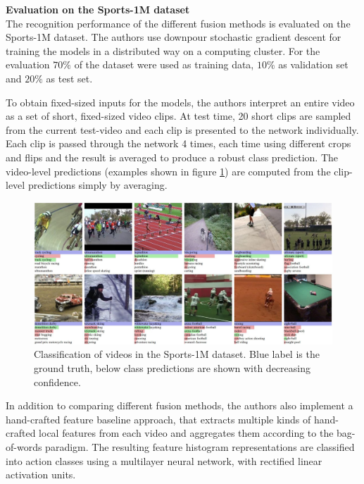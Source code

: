 \textbf{Evaluation on the Sports-1M dataset}\\
The recognition performance of the different fusion methods is evaluated on the Sports-1M dataset.
The authors use downpour stochastic gradient descent \cite{dean_large_2012} for training the models in a distributed way on a computing cluster.
For the evaluation $70\%$ of the dataset were used as training data, $10\%$ as validation set and $20\%$ as test set.

To obtain fixed-sized inputs for the models, the authors interpret an entire video as a set of short, fixed-sized video clips.
At test time, 20 short clips are sampled from the current test-video and each clip is presented to the network individually.
Each clip is passed through the network 4 times, each time using different crops and flips and the result is averaged to produce a robust class prediction.
The video-level predictions (examples shown in figure \ref{fig:largescale_classification}) are computed from the clip-level predictions simply by averaging.

\begin{figure}[H]
    \centering
    \includegraphics[width=\textwidth]{img_deep/largescale_classification}
    \caption{Classification of videos in the Sports-1M dataset. Blue label is the ground truth, below class predictions are shown with decreasing confidence. \cite{karpathy_large-scale_2014}}
    \label{fig:largescale_classification}
\end{figure}

In addition to comparing different fusion methods, the authors also implement a hand-crafted feature baseline approach, that extracts multiple kinds of hand-crafted local features from each video and aggregates them according to the bag-of-words paradigm.
The resulting feature histogram representations are classified into action classes using a multilayer neural network, with rectified linear activation units.


